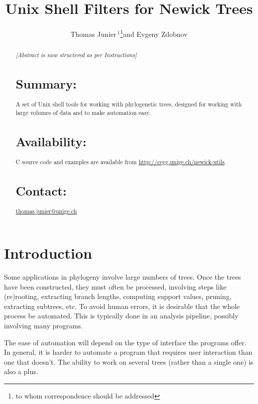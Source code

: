 \documentclass{bioinfo}
\newcommand{\unix}{Unix}
\newcommand{\unix}{\textsc{Unix}}
\begin{document}

\title{\unix{} Shell Filters for Newick Trees}
\author[Junier and Zdobnov]{Thomas Junier\,$^{1}$\footnote{to whom correspondence should be addressed}\hspace{1em}and Evgeny Zdobnov}
\address{$^{1}$Department of Genetic and Development Medicine, Faculty of Medicine, University of Geneva, Geneva, Switzerland}




\maketitle

\begin{abstract}
\emph{[Abstract is now structered as per Instructions]}
\section{Summary:}
A set of \unix{} shell tools for working with phylogenetic trees, designed for working with large volumes of data and to make automation easy.
\section{Availability:}
C source code and examples are available from \url{http://cegg.unige.ch/newick-utils}.
\section{Contact:}
\href{thomas.junier@unige.ch}{thomas.junier@unige.ch}
\end{abstract}
 
\section{Introduction}

Some applications in phylogeny involve large numbers of trees. Once the trees have been constructed, they must often be processed, involving steps like (re)rooting, extracting branch lengths, computing support values, pruning, extracting subtrees, etc. To avoid human errors, it is desirable that the whole process  be automated. This is typically done in an analysis pipeline, possibly involving many programs.

The ease of automation will depend on the type of interface the programs offer. In general, it is harder to automate a program that requires user interaction than one that doesn't. The ability to work on several trees (rather than a single one) is also a plus.
\end{document}

